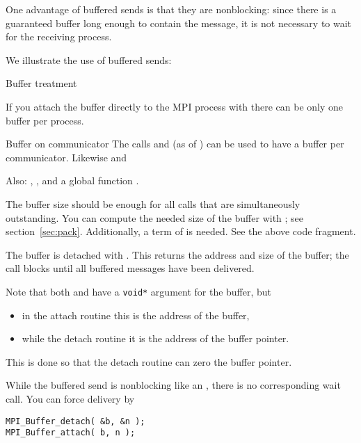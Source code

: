 One advantage of buffered sends is that they are nonblocking:
since there is a guaranteed buffer long enough to contain the
message, it is not necessary to wait for the receiving process.

We illustrate the use of buffered sends:


 {Buffer treatment}

If you attach the buffer directly to the MPI process
with 
there can be only one buffer per process.

\begin{mpifournote}{Buffer on communicator}
  The calls 
  and 
  (as of )
  can be used to have a buffer per communicator.
  Likewise 
  and 

  Also: , ,
  and a global function .
\end{mpifournote}

The buffer size should be enough
for all  calls that are simultaneously
outstanding.
You can compute the needed size of the buffer with ;
see section~\ref{sec:pack}.
Additionally, a term of  is needed.
See the above code fragment.

The buffer is detached with .
This returns the address and size of the buffer; the call blocks
until all buffered messages have been delivered.

Note that both
 and 
have a \lstinline+void*+ argument for the buffer, but 
\begin{itemize}
\item in the attach routine this is the address of the buffer,
\item while the detach routine it is the address of the buffer pointer.
\end{itemize}
This is done so that the detach routine can zero the buffer pointer.

While the buffered send is nonblocking like an ,
there is no corresponding wait call.
You can force delivery by
\begin{lstlisting}
MPI_Buffer_detach( &b, &n );
MPI_Buffer_attach( b, n );
\end{lstlisting}

